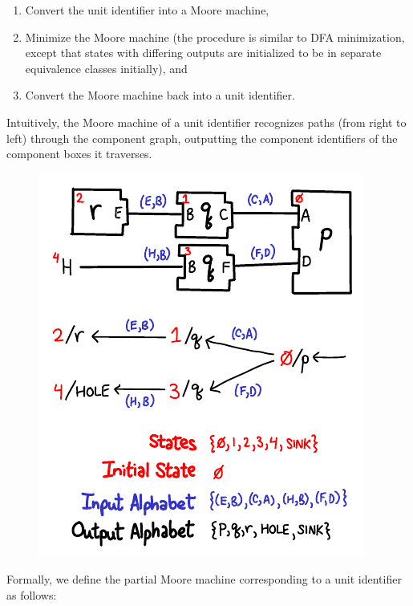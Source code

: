\begin{enumerate}
\item Convert the unit identifier into a Moore machine,
\item Minimize the Moore machine (the procedure is similar to DFA
   minimization, except that states with differing outputs are
   initialized to be in separate equivalence classes initially), and
\item Convert the Moore machine back into a unit identifier.
\end{enumerate}
%
Intuitively, the Moore machine of a unit identifier recognizes paths
(from right to left) through the component graph, outputting the
component identifiers of the component boxes it traverses.

\begin{figure}[H]
\center\includegraphics{figures/moore-description.pdf}
\end{figure}

\noindent
Formally, we define the partial Moore machine corresponding to a unit
identifier as follows:

